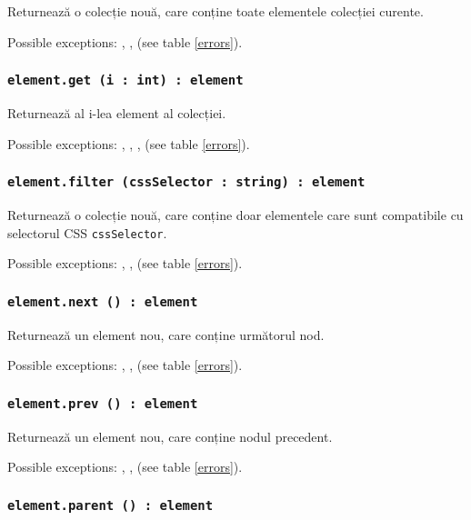 Returnează o colecție nouă, care conține toate elementele colecției curente.

Possible exceptions: , ,  (see table \ref{errors}).

\subsubsection{\texttt{element.get (i : int) : element}}

Returnează al i-lea element al colecției.

Possible exceptions: , , ,  (see table \ref{errors}).

\subsubsection{\texttt{element.filter (cssSelector : string) : element}}

Returnează o colecție nouă, care conține doar elementele care sunt compatibile cu selectorul CSS \texttt{cssSelector}.

Possible exceptions: , ,  (see table \ref{errors}).
\subsubsection{\texttt{element.next () : element}}

Returnează un element nou, care conține următorul nod.

Possible exceptions: , ,  (see table \ref{errors}).

\subsubsection{\texttt{element.prev () : element}}

Returnează un element nou, care conține nodul precedent.

Possible exceptions: , ,  (see table \ref{errors}).

\subsubsection{\texttt{element.parent () : element}}

